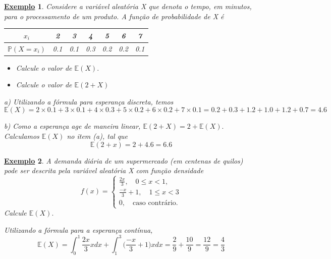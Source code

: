 \documentclass{article}
\newtheorem{example}{\underline{Exemplo}}
\begin{document}
\begin{example}
  Considere a variável aleatória X que denota o tempo, em minutos, para o processamento de um produto. A função de probabilidade de X é 
 \begin{center}
   \begin{table}[h!]
   \centering
     \begin{tabular}{| c | c c c c c c |}
       \hline 
       \(x_{i}\) & 2 & 3 & 4 & 5 & 6 & 7\\
       \hline
       \(\mathbb{P}(X = x_{i})\) & 0.1 & 0.1 & 0.3 & 0.2 & 0.2 & 0.1\\
       \hline
     \end{tabular}
   \end{table}
 \end{center}
\begin{itemize}
  \item[a)] Calcule o valor de \(\mathbb{E}(X).\)
  \item[b)] Calcule o valor de \(\mathbb{E}(2 + X)\)
\end{itemize}
  
  a) Utilizando a fórmula para esperança discreta, temos 
    \[
      \mathbb{E}(X) = 2\times 0.1 + 3\times 0.1 + 4\times 0.3 + 5\times 0.2 + 6\times 0.2 + 7\times 0.1 = 0.2 + 0.3 + 1.2 + 1.0 + 1.2 + 0.7 = 4.6
    \]

  b) Como a esperança age de maneira linear, \(\mathbb{E}(2 + X) = 2 + \mathbb{E}(X).\) Calculamos \(\mathbb{E}(X)\) no item (a), tal que 
    \[
      \mathbb{E}(2+x) = 2 + 4.6 = 6.6
    \]
\end{example}
\begin{example}
  A demanda diária de um supermercado (em centenas de quilos) pode ser descrita pela variável aleatória X com função densidade 
    \[
      f(x) = \left\{\begin{array}{ll}
          \frac{2x}{3},\quad 0\leq x <1,\\
          \frac{-x}{3} + 1,\quad 1\leq x <3\\
          0,\quad \text{caso contrário}.
        \end{array}\right.
    \]
  Calcule \(\mathbb{E}(X).\)

  Utilizando a fórmula para a esperança contínua, 
    \[
      \mathbb{E}(X) = \int_{0}^{1}\frac{2x}{3}xdx + \int_{1}^{3}\biggl(\frac{-x}{3} + 1\biggr)xdx = \frac{2}{9} + \frac{10}{9} = \frac{12}{9} = \frac{4}{3} 
    \]
\end{example}
\end{document}
